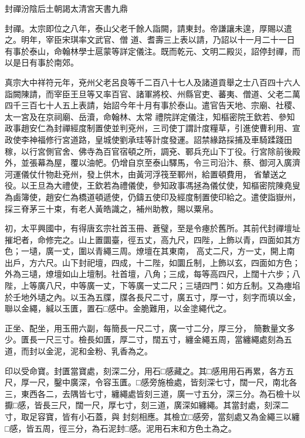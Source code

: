 
\begin{pinyinscope}

 封禪汾陰后土朝謁太清宮天書九鼎



 封禪。太宗即位之八年，泰山父老千餘人詣闕，請東封。帝謙讓未遑，厚賜以遣之。明年，宰臣宋琪率文武官、僧
 道、耆壽三上表以請，乃詔以十一月二十一日有事於泰山，命翰林學士扈蒙等詳定儀注。既而乾元、文明二殿災，詔停封禪，而以是日有事於南郊。



 真宗大中祥符元年，兗州父老呂良等千二百八十七人及諸道貢舉之士八百四十六人詣闕陳請，而宰臣王旦等又率百官、諸軍將校、州縣官吏、蕃夷、僧道、父老二萬四千三百七十人五上表請，始詔今年十月有事於泰山。遣官告天地、宗廟、社稷、太一宮及在京祠廟、岳瀆，命翰林、太常
 禮院詳定儀注，知樞密院王欽若、參知政事趙安仁為封禪經度制置使並判兗州，三司使丁謂計度糧草，引進使曹利用、宣政使李神福修行宮道路，皇城使劉承珪等計度發運。詔禁緣路採捕及車騎蹂踐田稼，以行宮側官舍、佛寺為百官宿頓之所，調兗、鄆兵充山下丁役。行宮除前後殿外，並張幕為屋，覆以油帊。仍增自京至泰山驛馬，令三司沿汴、蔡、御河入廣濟河運儀仗什物赴兗州，發上供木，由黃河浮筏至鄆州，給置頓費用，
 省輦送之役。以王旦為大禮使，王欽若為禮儀使，參知政事馮拯為儀仗使，知樞密院陳堯叟為鹵簿使，趙安仁為橋道頓遞使，仍鑄五使印及經度制置使印給之。遣使詣嶽州，採三脊茅三十束，有老人黃皓識之，補州助教，賜以粟帛。



 初，太平興國中，有得唐玄宗社首玉冊、蒼璧，至是令瘞於舊所。其前代封禪壇址摧圯者，命修完之。山上置圜臺，徑五丈，高九尺，四陛，上飾以青，四面如其方色；一壝，廣一丈，圍以青繩三周。燎壇在其東南，
 高丈二尺，方一丈，開上南出戶，方六尺。山下封祀壇，四成，十二陛，如圜丘制，上飾以玄，四面如方色；外為三壝，燎壇如山上壇制。社首壇，八角；三成，每等高四尺，上闊十六步；八陛，上等廣八尺，中等廣一丈，下等廣一丈二尺；三壝四門：如方丘制。又為瘞埳於壬地外壝之內。以玉為五牒，牒各長尺二寸，廣五寸，厚一寸，刻字而填以金，聯以金繩，緘以玉匱，置石□感中。金脆難用，以金塗繩代之。



 正坐、配坐，用玉冊六副，每簡長一尺二寸，廣一寸二分，厚三分，
 簡數量文多少。匱長一尺三寸。檢長如匱，厚二寸，闊五寸，纏金繩五周，當纏繩處刻為五道，而封以金泥，泥和金粉、乳香為之。



 印以受命寶。封匱當寶處，刻深二分，用石□感藏之。其□感用用石再累，各方五尺，厚一尺，鑿中廣深，令容玉匱。□感旁施檢處，皆刻深七寸，闊一尺，南北各三，東西各二，去隅皆七寸，纏繩處皆刻三道，廣一寸五分，深三分。為石檢十以擫□感，皆長三尺，闊一尺，厚七寸，刻三道，廣深如纏繩。其當封處，刻深二寸，取足容寶，皆有小石蓋，與
 封刻相應。其檢立□感旁，當刻處又為金繩三以纏□感，皆五周，徑三分，為石泥封□感。泥用石末和方色土為之。




\end{pinyinscope}
